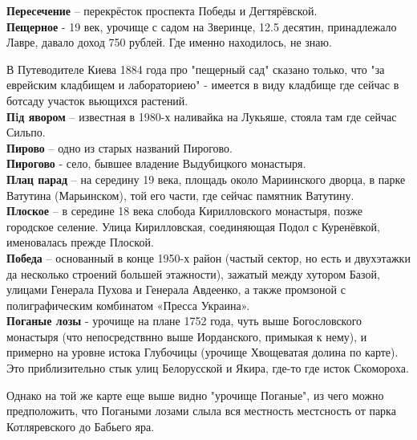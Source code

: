 \textbf{Пересечение} – перекрёсток проспекта Победы и Дегтярёвской.\\



\textbf{Пещерное} - 19 век, урочище с садом на Зверинце, 12.5 десятин, принадлежало Лавре, давало доход 750 рублей. Где именно находилось, не знаю.

В Путеводителе Киева 1884 года про "пещерный сад" сказано только, что "за еврейским кладбищем и лабораториею" - имеется в виду кладбище где сейчас в ботсаду участок вьющихся растений.\\



\textbf{Пiд явором} – известная в 1980-х наливайка на Лукьяше, стояла там где сейчас Сильпо.\\

\textbf{Пирово} – одно из старых названий Пирогово.\\

\textbf{Пирогово} - село, бывшее владение Выдубицкого монастыря.\\

\textbf{Плац парад} – на середину 19 века, площадь около Мариинского дворца, в парке Ватутина (Марьинском), той его части, где сейчас памятник Ватутину.\\

\textbf{Плоское} – в середине 18 века слобода Кирилловского монастыря, позже городское селение. Улица Кирилловская, соединяющая Подол с Куренёвкой, именовалась прежде Плоской.\\

\textbf{Победа} – основанный в конце 1950-х район (частый сектор, но есть и двухэтажки да несколько строений большей этажности), зажатый между хутором Базой, улицами Генерала Пухова и Генерала Авдеенко, а также промзоной с полиграфическим комбинатом «Пресса Украина».\\ 

\textbf{Поганые лозы} - урочище на плане 1752 года, чуть выше Богословского монастыря (что непосредствнно выше Иорданского, примыкая к нему), и примерно на уровне истока Глубочицы (урочище Хвощеватая долина по карте). Это приблизительно стык улиц Белорусской и Якира, где-то где исток Скомороха.
  
   Однако на той же карте еще выше видно "урочище Поганые", из чего можно предположить, что Погаными лозами слыла вся местность местсность от парка Котляревского до Бабьего яра.

